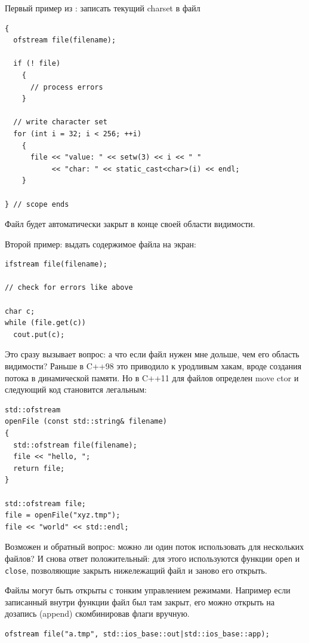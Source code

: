 \documentclass[a4paper,12pt,oneside]{book}
\begin{document}
Первый пример из \cite{josuttis2}: записать текущий charset в файл

\begin{lstlisting}
{
  ofstream file(filename);

  if (! file) 
    {
      // process errors
    }

  // write character set
  for (int i = 32; i < 256; ++i) 
    {
      file << "value: " << setw(3) << i << " " 
           << "char: " << static_cast<char>(i) << endl;
    }

} // scope ends
\end{lstlisting}

Файл будет автоматически закрыт в конце своей области видимости.

Второй пример: выдать содержимое файла на экран:

\begin{lstlisting}
ifstream file(filename);

// check for errors like above

char c;
while (file.get(c)) 
  cout.put(c);
\end{lstlisting}

Это сразу вызывает вопрос: а что если файл нужен мне дольше, чем его область видимости? Раньше в C++98 это приводило к уродливым хакам, вроде создания потока в динамической памяти. Но в C++11 для файлов определен move ctor и следующий код становится легальным:

\begin{lstlisting}
std::ofstream 
openFile (const std::string& filename)
{
  std::ofstream file(filename);
  file << "hello, ";
  return file;
}

std::ofstream file;
file = openFile("xyz.tmp");
file << "world" << std::endl;
\end{lstlisting}

Возможен и обратный вопрос: можно ли один поток использовать для нескольких файлов? И снова ответ положительный: для этого используются функции \lstinline!open! и \lstinline!close!, позволяющие закрыть нижележащий файл и заново его открыть.

Файлы могут быть открыты с тонким управлением режимами. Например если записанный внутри функции файл был там закрыт, его можно открыть на дозапись (append) скомбинировав флаги вручную.

\begin{lstlisting}
ofstream file("a.tmp", std::ios_base::out|std::ios_base::app);
\end{lstlisting}
\end{document}
